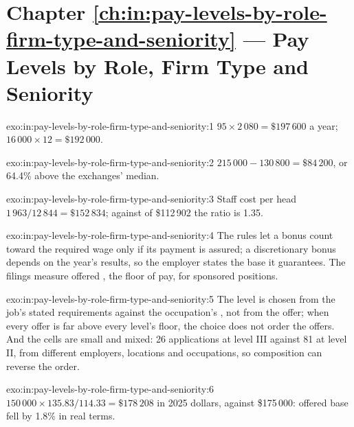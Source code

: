 \section*{Chapter \ref{ch:in:pay-levels-by-role-firm-type-and-seniority} --- Pay Levels by Role, Firm Type and Seniority}

\begin{solution}{exo:in:pay-levels-by-role-firm-type-and-seniority:1}
$95\times2\,080=\$197\,600$ a year; $16\,000\times12=\$192\,000$.
\end{solution}

\begin{solution}{exo:in:pay-levels-by-role-firm-type-and-seniority:2}
$215\,000-130\,800=\$84\,200$, or 64.4\% above the exchanges' median.
\end{solution}

\begin{solution}{exo:in:pay-levels-by-role-firm-type-and-seniority:3}
Staff cost per head $1\,963/12\,844=\$152\,834$; against  of \$112\,902 the ratio is 1.35.
\end{solution}

\begin{solution}{exo:in:pay-levels-by-role-firm-type-and-seniority:4}
The rules let a bonus count toward the required wage only if its payment is assured; a discretionary bonus depends on
the year's results, so the employer states the base it guarantees. The filings measure offered , the floor of
pay, for sponsored positions.
\end{solution}

\begin{solution}{exo:in:pay-levels-by-role-firm-type-and-seniority:5}
The level is chosen from the job's stated requirements against the occupation's , not from the offer;
when every offer is far above every level's floor, the choice does not order the offers. And the cells are small and
mixed: 26 applications at level III against 81 at level II, from different employers, locations and occupations, so
composition can reverse the order.
\end{solution}

\begin{solution}{exo:in:pay-levels-by-role-firm-type-and-seniority:6}
$150\,000\times135.83/114.33=\$178\,208$ in 2025 dollars, against \$175\,000: offered base fell by 1.8\% in real terms.
\end{solution}

